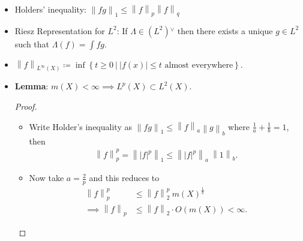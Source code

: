 \begin{concept}

\envlist

\begin{itemize}
\item
  Holders' inequality:
  \({\left\lVert {fg} \right\rVert}_1 \leq {\left\lVert {f} \right\rVert}_p {\left\lVert {f} \right\rVert}_q\)
\item
  Riesz Representation for \(L^2\): If \(\Lambda \in (L^2) {}^{ \vee }\)
  then there exists a unique \(g\in L^2\) such that
  \(\Lambda(f) = \int fg\).
\item
  \({\left\lVert {f} \right\rVert}_{L^\infty(X)} \coloneqq\inf \left\{{t\geq 0 {~\mathrel{\Big|}~}{\left\lvert {f(x)} \right\rvert} \leq t \text{ almost everywhere} }\right\}\).
\item
  \textbf{Lemma}: \(m(X) < \infty \implies L^p(X) \subset L^2(X)\).

  \begin{proof}

  \hfill

  \begin{itemize}
  \item
    Write Holder's inequality as
    \({\left\lVert {fg} \right\rVert}_1 \leq {\left\lVert {f} \right\rVert}_a {\left\lVert {g} \right\rVert}_b\)
    where \(\frac 1 a + \frac 1 b = 1\), then
    \begin{align*}
    {\left\lVert {f} \right\rVert}_p^p = {\left\lVert {{\left\lvert {f} \right\rvert}^p} \right\rVert}_1 \leq {\left\lVert {{\left\lvert {f} \right\rvert}^p} \right\rVert}_a ~{\left\lVert {1} \right\rVert}_b
    .\end{align*}
  \item
    Now take \(a = \frac 2 p\) and this reduces to
    \begin{align*}
    {\left\lVert {f} \right\rVert}_p^p &\leq {\left\lVert {f} \right\rVert}_2^p ~m(X)^{\frac 1 b} \\
    \implies {\left\lVert {f} \right\rVert}_p &\leq {\left\lVert {f} \right\rVert}_2 \cdot O(m(X)) < \infty
    .\end{align*}
  \end{itemize}

  \end{proof}
\end{itemize}

\end{concept}

